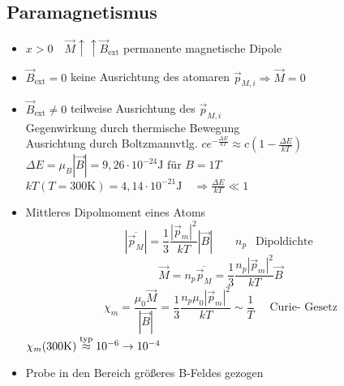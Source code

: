\documentclass[titlepage,12pt,a4paper,ngerman]{report}
\newcommand{\tx}[1]{\textrm{#1}}
\begin{document}
\subsection{Paramagnetismus}
\begin{itemize}
	\item $ x>0 \quad \vec{M} \uparrow\uparrow \vec{B}_{\tx{ext}} $ permanente magnetische Dipole
	\item $ \vec{B}_{\tx{ext}} = 0 $ keine Ausrichtung des atomaren $ \vec{p}_{M,i} \Rightarrow \vec{M} = 0 $
	\item $ \vec{B}_{\tx{ext}} \neq 0 $ teilweise Ausrichtung des $ \vec{p}_{M,i} $\\
	Gegenwirkung durch thermische Bewegung\\
	Ausrichtung durch Boltzmannvtlg. $ c e^{-\frac{\Delta E}{kT}} \approx
	 c ( 1- \frac{\Delta E}{k T}) $\\
	 $  \Delta E = \mu_B |\vec{B}| = 9,26 \cdot 10 ^{-24} \tx{J für }  B = 1 T $\\
	 $ kT (T= 300 \tx{K}) = 4,14 \cdot 10^{-21} \tx{J} \quad \Rightarrow \frac{\Delta E}{kT} \ll 1$
	 \item  Mittleres Dipolmoment eines Atoms
	 $$| \overline{\vec{p}_M}| = \frac{1}{3} \frac{| \vec{p}_m|^2}{k T}| \vec{B}| \qquad  n_p \ \ \tx{ Dipoldichte }$$ 
	 $$\vec{M} = n_p \overline{\vec{p}_M} = \frac{1}{3} \frac{n_p | \vec{p}_m|^2}{kT} \vec{B}$$
	 $$ \boxed{\chi_m = \frac{\mu_0 \vec{M}}{|\vec{B}|} = \frac{1}{3} \frac{n_p \mu_0 | \vec{p}_m |^2}{kT} \sim \frac{1}{T}} \quad \tx{ Curie- Gesetz}$$
	 $\chi_m (300\tx{K}) \buildrel \tx{typ} \over \approx 10^{-6} \rightarrow 10 ^{-4}$
	 \item Probe in den Bereich größeres B-Feldes gezogen
\end{itemize}
\end{document}
